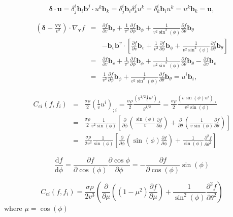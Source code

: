 \documentclass[preprint,12pt]{elsarticle}
\newcommand{\pdv}[2]{\frac{\partial{#1}}{\partial{#2}}}
\newcommand{\vect}[1]{\boldsymbol{#1}}
\newcommand{\matr}[1]{\mathbf{#1}}
\newcommand{\dI}{\text{d}}
\newcommand{\odv}[2]{\frac{\dI #1}{\dI #2}}
\newcommand{\vmag}{v}
\newcounter{bla}
\begin{document}
\begin{equation}
  \matr{\delta}\cdot\vect{u} = 
  \delta^i_j\vect{b}_i\vect{b}^j\cdot u^k\vect{b}_k =  
  \delta^i_j\vect{b}_i \delta^j_k u^k = \delta^i_k\vect{b}_i u^k 
  = u^k \vect{b}_k = \vect{u} ,
  \nonumber
\end{equation}

\begin{eqnarray}
  \left(\matr{\delta} - \frac{\vect{v}\vect{v}}{\vmag^2} \right)
  \cdot\nabla_{\vect{v}} f &=& 
  \pdv{f}{\vmag}\vect{b}_\vmag + \frac{1}{\vmag^2}\pdv{f}{\phi}\vect{b}_\phi
  + \frac{1}{\vmag^2\sin^2(\phi)}\pdv{f}{\theta}\vect{b}_{\theta} \nonumber \\ 
  &&- \vect{b}_\vmag\vect{b}^\vmag\cdot\left[\pdv{f}{\vmag}\vect{b}_\vmag 
  + \frac{1}{\vmag^2}\pdv{f}{\phi}\vect{b}_\phi
  + \frac{1}{\vmag^2\sin^2(\phi)}\pdv{f}{\theta}\vect{b}_{\theta} \right]
  \nonumber \\
  &=& \pdv{f}{\vmag}\vect{b}_\vmag 
  + \frac{1}{\vmag^2}\pdv{f}{\phi}\vect{b}_\phi
  + \frac{1}{\vmag^2\sin^2(\phi)}\pdv{f}{\theta}\vect{b}_{\theta}  
  - \pdv{f}{\vmag}\vect{b}_\vmag \nonumber \\
  &=& \frac{1}{\vmag^2}\pdv{f}{\phi}\vect{b}_\phi
  + \frac{1}{\vmag^2\sin^2(\phi)}\pdv{f}{\theta}\vect{b}_{\theta} 
  = u^i\vect{b}_i ,
\end{eqnarray}

\begin{eqnarray}
  C_{ei}(f, f_i) &=& \frac{\sigma\rho}{2}\left(\frac{1}{\vmag}u^i\right)_{;i} 
  = \frac{\sigma\rho}{2} \frac{(g^{1/2} \frac{1}{\vmag}u^i)_{,i}}{g^{1/2}}
  = \frac{\sigma\rho}{2} \frac{(\vmag\sin(\phi)u^i)_{,i}}{\vmag^2\sin(\phi)}
  \nonumber\\
  &=& \frac{\sigma\rho}{2} \frac{1}{\vmag^2\sin(\phi)}
  \left[\pdv{}{\phi}\left(\frac{\sin(\phi)}{\vmag}\pdv{f}{\phi}\right)
  + \pdv{}{\theta}\left(\frac{1}{\vmag\sin(\phi)}\pdv{f}{\theta}\right) \right]
  \nonumber\\
  &=& \frac{\sigma\rho}{2\vmag^3} \frac{1}{\sin(\phi)}
  \left[\pdv{}{\phi}\left(\sin(\phi)\pdv{f}{\phi}\right)
  + \frac{1}{\sin(\phi)}\frac{\partial^2f}{\partial\theta^2} \right]
\end{eqnarray}

\begin{equation}
  \odv{f}{\phi} = \pdv{f}{\cos(\phi)}\pdv{\cos{\phi}}{\phi} 
  = - \pdv{f}{\cos(\phi)}\sin(\phi)
\end{equation}

\begin{equation}
  C_{ei}(f, f_i) = \frac{\sigma\rho}{2\vmag^3} 
  \left(\pdv{}{\mu}\left((1 - \mu^2)\pdv{f}{\mu}\right)
  + \frac{1}{\sin^2(\phi)}\frac{\partial^2f}{\partial\theta^2} \right)
\end{equation}
where $\mu = \cos(\phi)$
\end{document}
